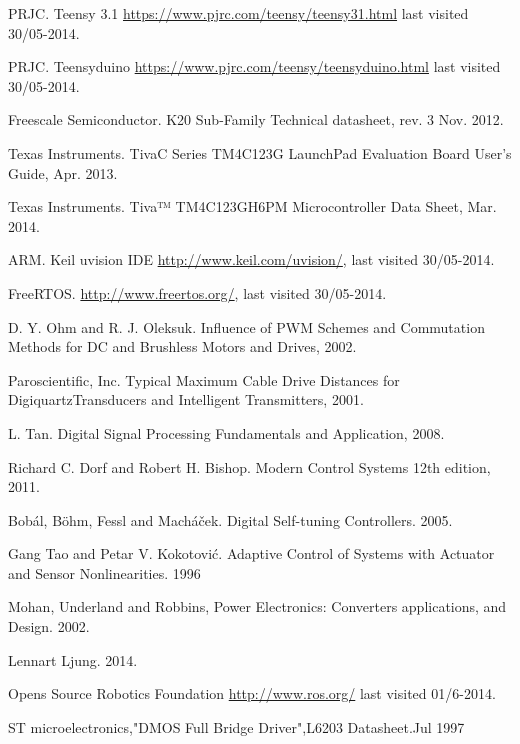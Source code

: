 \begin{thebibliography}{1}
 PRJC. Teensy 3.1 \url{https://www.pjrc.com/teensy/teensy31.html} last visited 30/05-2014.

 PRJC. Teensyduino \url{https://www.pjrc.com/teensy/teensyduino.html} last visited 30/05-2014.

 Freescale Semiconductor. K20 Sub-Family Technical datasheet, rev. 3  Nov. 2012.

 Texas Instruments. Tiva\texttrademark C Series TM4C123G LaunchPad Evaluation Board User's Guide, Apr. 2013.

 Texas Instruments. Tiva™ TM4C123GH6PM Microcontroller Data Sheet, Mar. 2014.

 ARM. Keil uvision IDE \url{http://www.keil.com/uvision/}, last visited 30/05-2014.

 FreeRTOS. \url{http://www.freertos.org/}, last visited 30/05-2014.

 D. Y. Ohm and R. J. Oleksuk. Influence of PWM Schemes and Commutation Methods for DC and Brushless Motors and Drives, 2002.

 Paroscientific, Inc. Typical Maximum Cable Drive Distances for Digiquartz\textregistered Transducers and Intelligent Transmitters, 2001. 

 L. Tan. Digital Signal Processing Fundamentals and Application, 2008.

 Richard C. Dorf and Robert H. Bishop. Modern Control Systems 12th edition, 2011.

 Bobál, Böhm, Fessl and Machá\v{c}ek. Digital Self-tuning Controllers. 2005.

 Gang Tao and Petar V. Kokotovi\'{c}. Adaptive Control of Systems with Actuator and Sensor Nonlinearities. 1996

 Mohan, Underland and Robbins, Power Electronics: Converters applications, and Design. 2002.

 Lennart Ljung. 
 2014.

 Opens Source Robotics Foundation \url{http://www.ros.org/} last visited 01/6-2014.

ST microelectronics,"DMOS Full Bridge Driver",L6203 Datasheet.Jul 1997

\end{thebibliography} 

\newpage